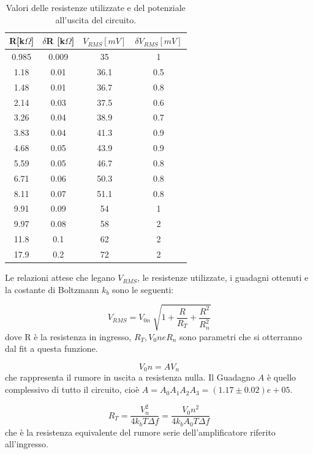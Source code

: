 \documentclass[a4paper,10pt]{article}
\begin{document}
\begin{table}[H]
	\centering
	\begin{tabular}{cccc}
		\hline
		R[k$\Omega$] & $\delta$R [k$\Omega$] & $V_{RMS}[mV]$  & $\delta$$V_{RMS}[mV]$ \\
		\hline
		0.985 & 0.009 & 35 & 1 \\
		1.18 & 0.01 & 36.1 & 0.5 \\
		1.48 & 0.01 & 36.7 & 0.8 \\
		2.14 & 0.03 & 37.5 & 0.6 \\
		3.26 & 0.04 & 38.9 & 0.7 \\
		3.83 & 0.04 & 41.3 & 0.9 \\
		4.68 & 0.05 & 43.9 & 0.9 \\
		5.59 & 0.05 & 46.7 & 0.8 \\
		6.71 & 0.06 & 50.3 & 0.8 \\
		8.11 & 0.07 & 51.1 & 0.8 \\
		9.91 & 0.09 & 54 & 1 \\
		9.97 & 0.08 & 58 & 2 \\
		11.8 & 0.1 & 62 & 2 \\
		17.9 & 0.2 & 72 & 2 \\
		\hline
	\end{tabular}
	\caption{Valori delle resistenze utilizzate e del potenziale all'uscita del circuito.}
	\label{tab:lastfitav}
\end{table}

Le relazioni attese che legano $V_{RMS}$, le resistenze utilizzate, i guadagni ottenuti e la costante di Boltzmann $k_b$ sono le seguenti:

\begin{equation}
V_{RMS} = V_{0n} \sqrt[]{1+\frac{R}{R_T}+\frac{R^2}{R_n ^2}}
\label{fitt}
\end{equation}
dove R è la resistenza in ingresso, $R_T, V_0n e R_n$ sono parametri che si otterranno dal fit a questa funzione.

\begin{equation}
V_0n = A V_n
\label{resnull}
\end{equation}
 che rappresenta il rumore in uscita a resistenza nulla. Il Guadagno $A$ è quello complessivo di tutto il circuito, cioè $A = A_0 A_1 A_2 A_3 = (1.17\pm0.02)e+05 $.
 
 \begin{equation}
 R_T = \frac{V_n^2}{4k_b T \Delta f} = \frac{V_0n^2}{4k_b A_0 T \Delta f}
 \label{kb}
 \end{equation}
  che è la resistenza equivalente del rumore serie dell'amplificatore riferito all'ingresso.
\end{document}
